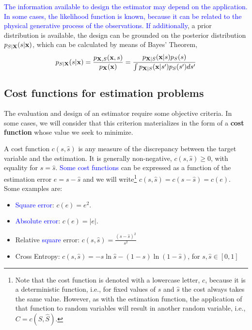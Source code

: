 \textcolor{blue}{The information available to design the estimator may depend on the application. In some cases, the likelihood function is known, because it can be related to the physical generative process of the observations. If additionally}, a prior distribution is available, the design can be grounded on the posterior distribution $p_{S|{\bf X}}(s|{\bf x})$, which can be calculated by means of Bayes' Theorem,
\begin{equation}
p_{S|{\bf X}}(s|{\bf x}) 
	= \frac{p_{{\bf X},S}({\bf x},s)} {p_{\bf X}({\bf x})} 
	= \frac{p_{{\bf X}|S}({\bf x}|s) p_S(s)}
	       {\int p_{{\bf X}|S}({\bf x}|s') p_S(s') ds'}
\end{equation}


\subsection{Cost functions for estimation problems}
\label{subsec_funcion_coste}

The evaluation and design of an estimator require some objective criteria. In some cases, we will consider that this criterion materializes in the form of a {\bf cost function} whose value we seek to minimize. %

A cost function $c(s,\hat s)$ is any measure of the discrepancy between the target variable and the estimation. It is generally non-negative, $c(s,\hat s) \geq 0$, with equality for $s = \hat s$. \textcolor{blue}{Some cost functions} can be expressed as a function of the estimation error $e= s-\hat s$ and we will write\footnote{Note that the cost function is denoted with a lowercase letter, $c$, because it is a deterministic function, i.e., for fixed values of $s$ and $\hat s$ the cost always takes the same value. However, as with the estimation function, the application of that function to random variables will result in another random variable, i.e., $C = c(S,\hat S)$.} $c(s,\hat s) = c(s - \hat s) = c(e)$. Some examples are:
\begin{itemize}
\item \textcolor{blue}{Square error}: $c(e) = e^2$.
\item \textcolor{blue}{Absolute error}: $c(e) = |e|$.
\item Relative \textcolor{blue}{square} error: $c(s,\hat s) = \frac{(s-\hat{s})^2}{s^2}$
\item Cross Entropy: $c(s,\hat s) = - s \ln \hat s - (1-s) \ln (1-\hat s)$, for $s,\hat{s}\in [0,1]$
\end{itemize}

